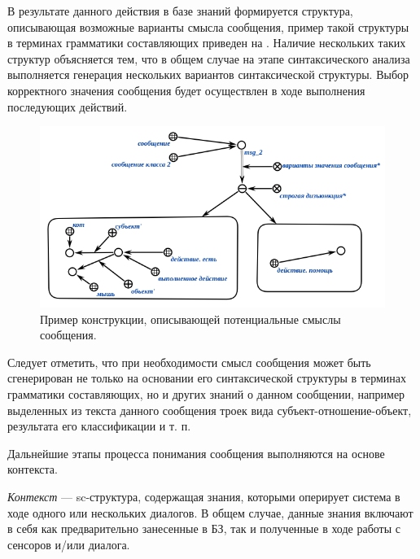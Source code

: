 {В результате данного действия в базе знаний формируется структура, описывающая возможные варианты смысла сообщения, пример такой структуры в терминах грамматики составляющих приведен на \textit{}.
Наличие нескольких таких структур объясняется тем, что в общем случае на этапе синтаксического анализа выполняется генерация нескольких вариантов синтаксической структуры.
Выбор корректного значения сообщения будет осуществлен в ходе выполнения последующих действий.

\begin{figure}[h]
    \centering
    \includegraphics[scale=0.8]{images/part4/chapter_nl_interfaces/messsage_meaning_variants}
    \caption{Пример конструкции, описывающей потенциальные смыслы сообщения.}
    \label{fig:messsage_meaning_variants}
\end{figure}

Следует отметить, что при необходимости смысл сообщения может быть сгенерирован не только на основании его синтаксической структуры в терминах грамматики составляющих, но и других знаний о данном сообщении, например выделенных из текста данного сообщения троек вида субъект-отношение-объект, результата его классификации и т. п.

Дальнейшие этапы процесса понимания сообщения выполняются на основе контекста.

\textit{Контекст} --- sc-структура, содержащая знания, которыми оперирует система в ходе одного или нескольких диалогов.
В общем случае, данные знания включают в себя как предварительно занесенные в БЗ, так и полученные в ходе работы с сенсоров и/или диалога.

\begin{SCn}

    \begin{scnindent}
        \begin{scneqtoset}
        \end{scneqtoset}
    \end{scnindent}


\end{SCn}}
